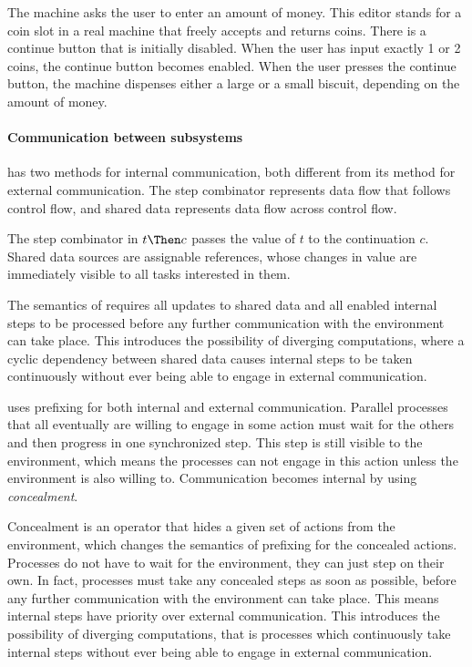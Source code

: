 The machine asks the user to enter an amount of money.
This editor stands for a coin slot in a real machine that freely accepts and returns coins.
There is a continue button that is initially disabled.
When the user has input exactly 1 or 2 coins, the continue button becomes enabled.
When the user presses the continue button, the machine dispenses either a large or a small biscuit, depending on the amount of money.


\paragraph{Communication between subsystems}

\TOP has two methods for internal communication, both different from its meth\-od for external communication.
The step combinator represents data flow that follows control flow, and shared data represents data flow across control flow.

The step combinator in $t \Then c$ passes the value of $t$ to the continuation $c$.
Shared data sources are assignable references, whose changes in value are immediately visible to all tasks interested in them.

The semantics of \TOP requires all updates to shared data and all enabled internal steps to be processed before any further communication with the environment can take place.
This introduces the possibility of diverging computations, where a cyclic dependency between shared data causes internal steps to be taken continuously without ever being able to engage in external communication.

\CSP uses prefixing for both internal and external communication.
Parallel processes that all eventually are willing to engage in some action must wait for the others and then progress in one synchronized step.
This step is still visible to the environment, which means the processes can not engage in this action unless the environment is also willing to.
Communication becomes internal by using \emph{concealment}.

Concealment is an operator that hides a given set of actions from the environment, which changes the semantics of prefixing for the concealed actions.
Processes do not have to wait for the environment, they can just step on their own.
In fact, processes must take any concealed steps as soon as possible, before any further communication with the environment can take place.
This means internal steps have priority over external communication.
This introduces the possibility of diverging computations, that is processes which continuously take internal steps without ever being able to engage in external communication.


